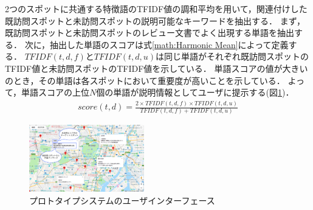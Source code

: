 \documentclass[submit,techrep,noauthor]{ipsj}
\begin{document}
2つのスポットに共通する特徴語のTFIDF値の調和平均を用いて，関連付けした既訪問スポットと未訪問スポットの説明可能なキーワードを抽出する．
まず，既訪問スポットと未訪問スポットのレビュー文書でよく出現する単語を抽出する．
次に，抽出した単語のスコアは式\ref{math:Harmonic Mean}によって定義する．
$TFIDF(t,d,f)$と$TFIDF(t,d,u)$は同じ単語がそれぞれ既訪問スポットのTFIDF値と未訪問スポットのTFIDF値を示している．
単語スコアの値が大きいのとき，その単語は各スポットにおいて重要度が高いことを示している．
よって，単語スコアの上位$N$個の単語が説明情報としてユーザに提示する(図\ref{fig:Photo_Map})．
\begin{eqnarray}
  score(t,d) = \frac{2 \times TFIDF(t,d,f) \times TFIDF(t,d,u)}{TFIDF(t,d,f) + TFIDF(t,d,u)}
  \label{math:Harmonic Mean}
\end{eqnarray}

\begin{figure}[t]
  \begin{center}
    \includegraphics[clip,width=5.0cm]{picture/Photo_Map2_jap.png}
    \caption{プロトタイプシステムのユーザインターフェース}
    \label{fig:Photo_Map}
   \end{center}
\end{figure}
\end{document}
